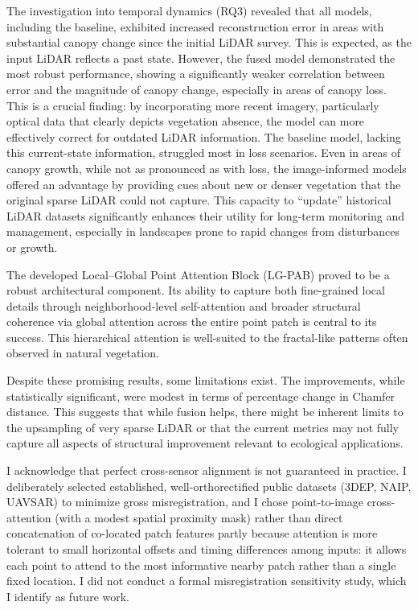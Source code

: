 \documentclass[12pt]{report}
\begin{document}
The investigation into temporal dynamics (RQ3) revealed that all models, including the baseline, exhibited increased reconstruction error in areas with substantial canopy change since the initial LiDAR survey. This is expected, as the input LiDAR reflects a past state. However, the fused model demonstrated the most robust performance, showing a significantly weaker correlation between error and the magnitude of canopy change, especially in areas of canopy loss. This is a crucial finding: by incorporating more recent imagery, particularly optical data that clearly depicts vegetation absence, the model can more effectively correct for outdated LiDAR information. The baseline model, lacking this current-state information, struggled most in loss scenarios. Even in areas of canopy growth, while not as pronounced as with loss, the image-informed models offered an advantage by providing cues about new or denser vegetation that the original sparse LiDAR could not capture. This capacity to ``update'' historical LiDAR datasets significantly enhances their utility for long-term monitoring and management, especially in landscapes prone to rapid changes from disturbances or growth.

The developed Local--Global Point Attention Block (LG-PAB) proved to be a robust architectural component. Its ability to capture both fine-grained local details through neighborhood-level self-attention and broader structural coherence via global attention across the entire point patch is central to its success. This hierarchical attention is well-suited to the fractal-like patterns often observed in natural vegetation.

Despite these promising results, some limitations exist. The improvements, while statistically significant, were modest in terms of percentage change in Chamfer distance. This suggests that while fusion helps, there might be inherent limits to the upsampling of very sparse LiDAR or that the current metrics may not fully capture all aspects of structural improvement relevant to ecological applications.

I acknowledge that perfect cross-sensor alignment is not guaranteed in practice. I deliberately selected established, well-orthorectified public datasets (3DEP, NAIP, UAVSAR) to minimize gross misregistration, and I chose point-to-image cross-attention (with a modest spatial proximity mask) rather than direct concatenation of co-located patch features partly because attention is more tolerant to small horizontal offsets and timing differences among inputs: it allows each point to attend to the most informative nearby patch rather than a single fixed location. I did not conduct a formal misregistration sensitivity study, which I identify as future work.
\end{document}
